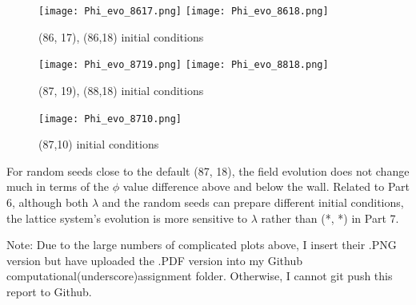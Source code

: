 \documentclass{article}
\begin{document}
\begin{figure}[H]
    \centering
    \texttt{[image: Phi\_evo\_8617.png]}
    \texttt{[image: Phi\_evo\_8618.png]}
    \caption{(86, 17), (86,18) initial conditions}
    \label{fig:Q1}
\end{figure}


\begin{figure}[H]
    \centering
    \texttt{[image: Phi\_evo\_8719.png]}
    \texttt{[image: Phi\_evo\_8818.png]}
    \caption{(87, 19), (88,18) initial conditions}
    \label{fig:Q1}
\end{figure}

\begin{figure}[H]
    \centering
    \texttt{[image: Phi\_evo\_8710.png]}
    \caption{(87,10) initial conditions}
    \label{fig:Q1}
\end{figure}

For random seeds close to the default (87, 18), the field evolution does not change much in terms of the $\phi$ value difference above and below the wall. Related to Part 6, although both $\lambda$ and the random seeds can prepare different initial conditions, the lattice system's evolution is more sensitive to $\lambda$ rather than (*, *) in Part 7. 

\vspace{5mm}

Note: Due to the large numbers of complicated plots above, I insert their .PNG version but have uploaded the .PDF version into my Github computational(underscore)assignment folder. Otherwise, I cannot git push this report to Github.
\end{document}

